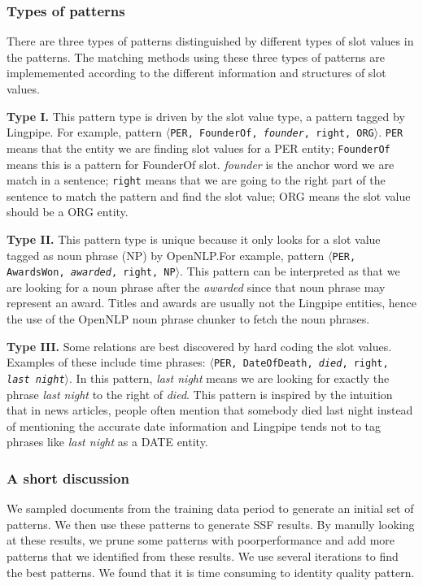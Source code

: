 \subsubsection{Types of patterns}
There are three types of patterns distinguished by different types of slot values in the patterns. The matching methods using these three types of patterns are implememented according to the different information and structures of slot values.

 
\textbf{Type I.} This pattern type is driven by the slot value type, a pattern tagged by Lingpipe. For example, pattern $\langle$\texttt{PER, FounderOf, \textit{founder}, right, ORG}$\rangle$. \texttt{PER} means 
that the entity we are finding slot values for a PER entity; \texttt{FounderOf} means this is a pattern for FounderOf slot. \textit{founder} is the anchor word we are match in a sentence; \texttt{right} means that we are going to the right part of the sentence to match the pattern and find the slot value; ORG means the slot value should be a ORG entity.

\textbf{Type II.} This pattern type is unique because it only looks for a slot value tagged as noun phrase (NP) by OpenNLP.\@ For example, pattern $\langle$\texttt{PER, AwardsWon, \textit{awarded}, right, NP}$\rangle$. This pattern can be interpreted as that we are looking for a noun phrase after the \textit{awarded} since that noun phrase may represent an award. Titles and awards are usually not the Lingpipe entities, hence the use of the OpenNLP noun phrase chunker to fetch the noun phrases.

\textbf{Type III.} Some relations are best discovered by hard coding the slot values. Examples of these include time phrases: $\langle$\texttt{PER, DateOfDeath, \textit{died}, right, \textit{last night}}$\rangle$. In this pattern, \textit{last night} means we are looking for exactly the phrase \textit{last night} to the right of \textit{died}. This pattern is inspired by the intuition that in news articles, people often mention that somebody died last night instead of mentioning the accurate date information and Lingpipe tends not to tag phrases like \textit{last night} as a DATE entity. 


\subsubsection{A short discussion}
We sampled documents from the training data period to generate an initial set of patterns. We then use these patterns to generate SSF results. By manully looking at these results, we prune some patterns with poor­performance and add more patterns that we identified from these results. We use several iterations to find the best patterns. We found that it is time consuming to identity quality pattern.



